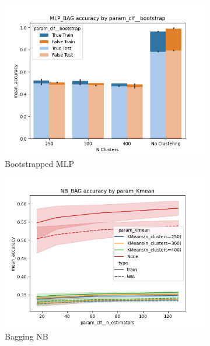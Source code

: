 \documentclass[12pt]{article}
\begin{document}
\begin{figure}
  \begin{subfigure}{.5\textwidth}
      \includegraphics[width=.95\textwidth]{../../results_Exp6_kmeans_still_sucks/mlp_bag/param_clf__bootstrap_accuracy_param_Kmean.png}
      \caption{Bootstrapped MLP}
      \end{subfigure}%
    \begin{subfigure}{.5\textwidth}
      \includegraphics[width=.95\textwidth]{../../results_Exp6_kmeans_still_sucks/NB_bag/param_Kmean_accuracy_param_clf__n_estimators.png}
      \caption{Bagging NB}
    \end{subfigure}
    \begin{subfigure}{.5\textwidth}

\end{subfigure}
\end{figure}
\end{document}
